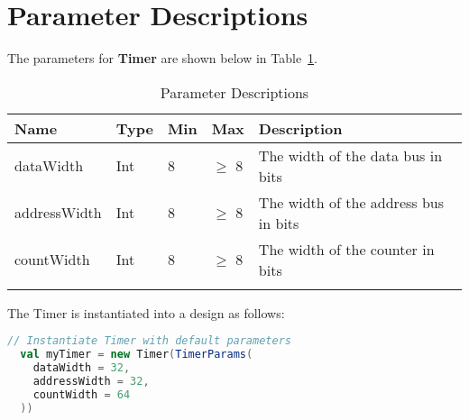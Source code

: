 \section{Parameter Descriptions}

The parameters for \textbf{Timer} are shown below in Table~\ref{table:params}.

\renewcommand*{\arraystretch}{1.4}
\begin{longtable}[H]{
    | p{}
    | p{}
    | p{}
    | p{}
    | p{} |
  }
  \hline
  \textbf{Name} &
  \textbf{Type} &
  \textbf{Min}  &
  \textbf{Max}  &
  \textbf{Description}            \\ \hline \hline

  dataWidth     &
  Int           &
  8             &
  $\ge$ 8       &
  The width of the data bus in bits      \\ \hline

  addressWidth  &
  Int           &
  8             &
  $\ge$ 8       &
  The width of the address bus in bits   \\ \hline

  countWidth    &
  Int           &
  8             &
  $\ge$ 8       &
  The width of the counter in bits       \\ \hline

  \caption{Parameter Descriptions}\label{table:params}
\end{longtable}

The Timer is instantiated into a design as follows:

\begin{lstlisting}[language=Scala]
  // Instantiate Timer with default parameters
  val myTimer = new Timer(TimerParams(
    dataWidth = 32,
    addressWidth = 32,
    countWidth = 64
  ))
\end{lstlisting}